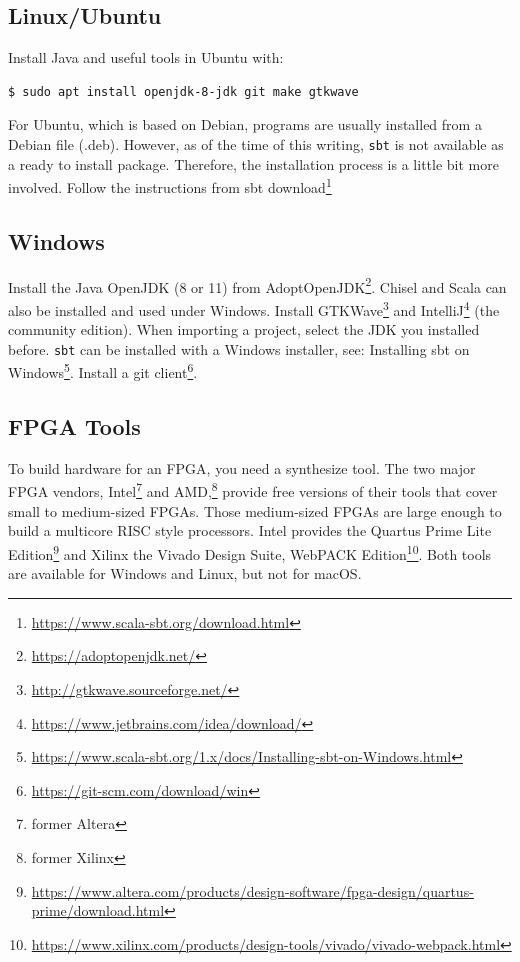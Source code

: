 \documentclass[%
    10pt,
    headinclude, footexclude,
    openright, %
    notitlepage,
    cleardoubleempty,
    headsepline,
    pointlessnumbers,
    bibtotoc, idxtotoc,
    ]{scrbook}
\newcommand{\code}[1]{{\lstinline[basicstyle=\small\ttfamily]{#1}}}
\newcommand{\myref}[2]{\href{#1}{#2}}
\renewcommand{\myref}[2]{{#2}{\footnote{\url{#1}}}}
\begin{document}
\subsection{Linux/Ubuntu}

Install Java and useful tools in Ubuntu with:
\begin{verbatim}
$ sudo apt install openjdk-8-jdk git make gtkwave
\end{verbatim}

For Ubuntu, which is based on Debian, programs are usually installed from a
Debian file (.deb). However, as of the time of this writing, \code{sbt} is not
available as a ready to install package. Therefore, the installation process
is a little bit more involved.
Follow the instructions from \myref{https://www.scala-sbt.org/download.html}{sbt download}

\subsection{Windows}

Install the Java OpenJDK (8 or 11) from \myref{https://adoptopenjdk.net/}{AdoptOpenJDK}.
Chisel and Scala can also be installed and used under Windows.
Install \myref{http://gtkwave.sourceforge.net/}{GTKWave} and
\myref{https://www.jetbrains.com/idea/download/}{IntelliJ} (the community edition).
When importing a project, select the JDK you installed before.
\code{sbt} can be installed with a Windows installer, see:
\myref{https://www.scala-sbt.org/1.x/docs/Installing-sbt-on-Windows.html}{Installing sbt on Windows}.
Install a \myref{https://git-scm.com/download/win}{git client}.

\subsection{FPGA Tools}

To build hardware for an FPGA, you need a synthesize tool. The two major
FPGA vendors, Intel\footnote{former Altera} and AMD,\footnote{former Xilinx} provide free versions of
their tools that cover small to medium-sized FPGAs. Those medium-sized
FPGAs are large enough to build a multicore RISC style processors.
Intel provides the \myref{https://www.altera.com/products/design-software/fpga-design/quartus-prime/download.html}{Quartus Prime Lite Edition} and Xilinx the
\myref{https://www.xilinx.com/products/design-tools/vivado/vivado-webpack.html}{Vivado Design Suite, WebPACK Edition}.
Both tools are available for Windows and Linux, but not for macOS.
\end{document}
